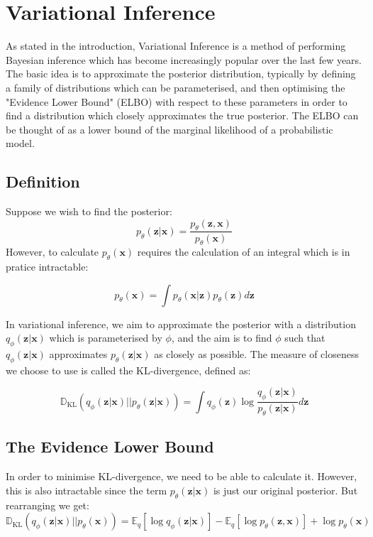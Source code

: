 \chapter{Variational Inference}
As stated in the introduction, Variational Inference is a method of performing Bayesian inference which has become increasingly popular over the last few years. 
The basic idea is to approximate the posterior distribution, typically by defining a family of distributions which can be parameterised, and then optimising the "Evidence Lower Bound" (ELBO) with respect to these parameters in order to find a distribution which closely approximates the true posterior. The ELBO can be thought of as a lower bound of the marginal likelihood of a probabilistic model.

\section{Definition}
Suppose we wish to find the posterior:
\begin{equation}
	p_\theta(\mathbf{z|x}) = \frac{p_\theta(\mathbf{z, x})}{p_\theta(\mathbf{x})}
\end{equation}
However, to calculate $p_\theta(\mathbf{x})$ requires the calculation of an integral which is in pratice intractable:

\begin{equation}
	p_\theta(\mathbf{x}) = \int p_\theta(\mathbf{x|z})p_\theta(\mathbf{z}) d\mathbf{z}
\end{equation}

In variational inference, we aim to approximate the posterior with a distribution $q_\phi(\mathbf{z|x})$ which is parameterised by $\phi$, and the aim is to find $\phi$ such that $q_\phi(\mathbf{z|x})$ approximates $p_\theta(\mathbf{z|x})$ as closely as possible. The measure of closeness we choose to use is called the KL-divergence, defined as:
 
 \begin{equation}
	\mathbb{D}_{\text{KL}}(q_\phi(\mathbf{z|x})||p_\theta(\mathbf{z|x})) = \int q_\phi(\mathbf{z}) \log \frac{q_\phi(\mathbf{z|x})}{p_\theta(\mathbf{z|x})} d\mathbf{z}
\end{equation}

\section{The Evidence Lower Bound}

In order to minimise KL-divergence, we need to be able to calculate it. However, this is also intractable since the term $p_\theta(\mathbf{z|x})$ is just our original posterior. But rearranging we get:
\begin{equation}
	\mathbb{D}_{\text{KL}}(q_\phi(\mathbf{z|x})||p_\theta(\mathbf{x})) = \mathbb{E}_q[\log q_\phi(\mathbf{z|x})] - \mathbb{E}_q[\log p_\theta(\mathbf{z,x})] + \log p_\theta(\mathbf{x})
\end{equation}

